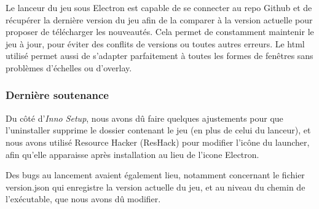         Le lanceur du jeu sous Electron est capable de se connecter au repo Github et de récupérer la 
        dernière version du jeu afin de la comparer à la version actuelle pour proposer de télécharger les nouveautés. 
        Cela permet de constamment maintenir le jeu à jour, pour éviter des conflits de versions 
        ou toutes autres erreurs. Le html utilisé permet aussi de s'adapter parfaitement à toutes les formes de 
        fenêtres sans problèmes d'échelles ou d'overlay.

    \subsubsection{Dernière soutenance}

        Du côté d'\textit{Inno Setup}, nous avons dû faire quelques ajustements pour que l'uninstaller supprime le dossier 
        contenant le jeu (en plus de celui du lanceur), et nous avons utilisé Resource Hacker (ResHack) pour modifier l'icône 
        du launcher, afin qu'elle apparaisse après installation au lieu de l'icone Electron.

        Des bugs au lancement avaient également lieu, notamment concernant le fichier version.json qui enregistre la version actuelle du jeu, 
        et au niveau du chemin de l'exécutable, que nous avons dû modifier.
    

